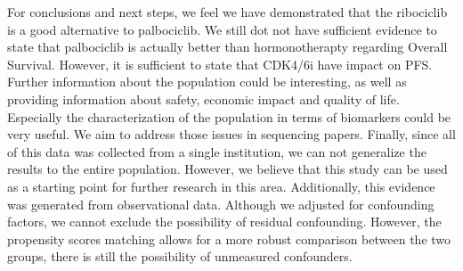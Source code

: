 For conclusions and next steps, we feel we have demonstrated that the ribociclib is a good alternative to palbociclib. We still dot not have sufficient evidence to state that palbociclib is actually better than hormonotherapty regarding Overall Survival. However, it is sufficient to state that CDK4/6i have impact on PFS.
Further information about the population could be interesting, as well as providing information about safety, economic impact and quality of life. Especially the characterization of the population in terms of biomarkers could be very useful. We aim to address those issues in sequencing papers. 
Finally, since all of this data was collected from a single institution, we can not generalize the results to the entire population. However, we believe that this study can be used as a starting point for further research in this area. Additionally, this evidence was generated from observational data. Although we adjusted for confounding factors, we cannot exclude the possibility of residual confounding. However, the propensity scores matching allows for a more robust comparison between the two groups, there is still the possibility of unmeasured confounders.